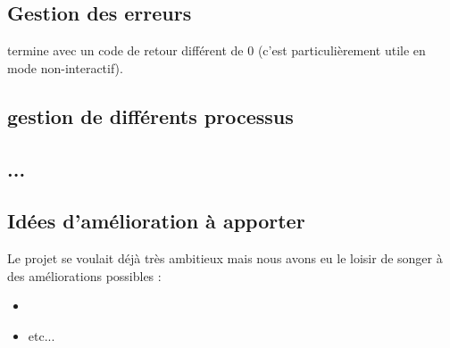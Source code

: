 \documentclass{article}
\begin{document}
\subsection{Gestion des erreurs}
termine avec un code de retour différent de 0 (c’est particulièrement utile en mode non-interactif).

\subsection{gestion de différents processus}
\subsection{...}

\subsection{Idées d'amélioration à apporter}
Le projet se voulait déjà très ambitieux mais nous avons eu le loisir de songer à des améliorations possibles : 
\begin{itemize}
    \item 
    \item etc... 
\end{itemize}

\newpage
\end{document}
